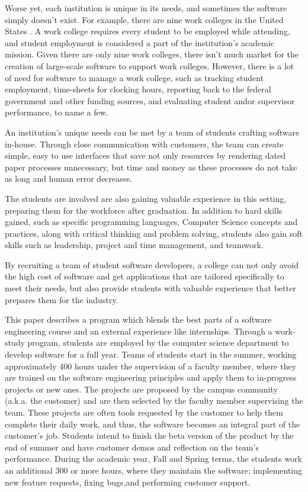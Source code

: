 Worse yet, each institution is unique in its needs, and sometimes the software simply doesn't exist. For example, there are nine work colleges in the United States \cite{WCCMembers, Ecclesia}. A work college requires every student to be employed while attending, and student employment is considered a part of the institution's academic mission. Given there are only nine work colleges, there isn't much market for the creation of large-scale software to support work colleges. However, there is a lot of need for software to manage a work college, such as tracking student employment, time-sheets for clocking hours, reporting back to the federal government and other funding sources, and evaluating student and\/or supervisor performance, to name a few. %


An institution's unique needs can be met by a team of students crafting software in-house. Through close communication with customers, the team can create simple, easy to use interfaces that save not only resources by rendering dated paper processes unnecessary, but time and money as these processes do not take as long and human error decreases. 

The students are involved are also gaining valuable experience in this setting, preparing them for the workforce after graduation. In addition to  hard skills gained, such as specific programming languages, Computer Science concepts and practices, along with critical thinking and problem solving, students also gain soft skills \cite{softskills} such as leadership, project and time management, and teamwork.

By recruiting a team of student software developers, a college can not only avoid the high cost of software and get applications that are tailored specifically to meet their needs, but also provide students with valuable experience that better prepares them for the industry. 

This paper describes a program which blends the best parts of a software engineering course and an external experience like internships. Through a work-study program, students are employed by the computer science department to develop software for a full year. Teams of students start in the summer, working approximately 400 hours under the supervision of a faculty member, where they are trained on the software engineering principles and apply them to in-progress projects or new ones. The projects are proposed by the campus community (a.k.a. the customer) and are then selected by the faculty member supervising the team. These projects are often tools requested by the customer to help them complete their daily work, and thus, the software becomes an integral part of the customer's job. Students intend to finish the beta version of the product by the end of summer and have customer demos and reflection on the team's performance. During the academic year, Fall and Spring terms, the students work an additional 300 or more hours, where they maintain the software; implementing new feature requests, fixing bugs,and performing customer support. 

